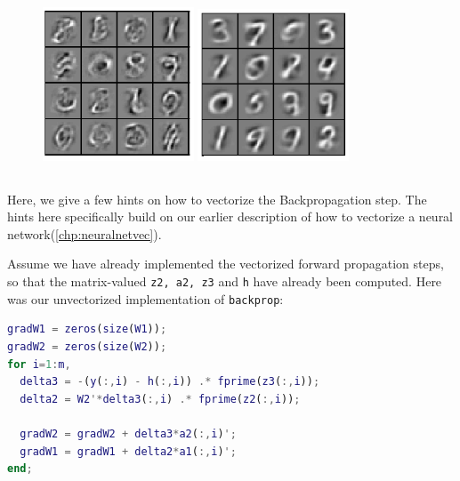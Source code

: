     {}
    {}
\begin{figure}[ht] \centering
  \includegraphics[width=0.4\textwidth]{figures/MNIST-false-bad-1.png}
  \includegraphics[width=0.4\textwidth]{figures/MNIST-false-bad-2.png}
\end{figure}


\subsection{} \label{chp:backpropvechints}

Here, we give a few hints on how to vectorize the Backpropagation step. The hints here specifically build on our earlier description of how to vectorize a neural network(\ref{chp:neuralnetvec}).

Assume we have already implemented the vectorized forward propagation steps, so that the matrix-valued \texttt{z2, a2, z3} and \texttt{h} have already been computed. Here was our unvectorized implementation of \texttt{backprop}:
\begin{lstlisting}[language=matlab]
gradW1 = zeros(size(W1));
gradW2 = zeros(size(W2)); 
for i=1:m,
  delta3 = -(y(:,i) - h(:,i)) .* fprime(z3(:,i)); 
  delta2 = W2'*delta3(:,i) .* fprime(z2(:,i));
 
  gradW2 = gradW2 + delta3*a2(:,i)';
  gradW1 = gradW1 + delta2*a1(:,i)'; 
end;
\end{lstlisting}

